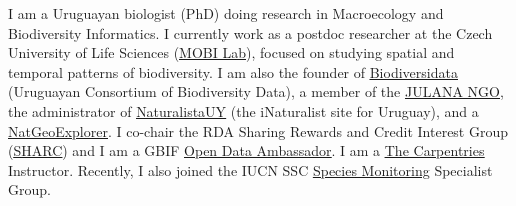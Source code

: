 \documentclass[9pt]{developercv} %
\begin{document}


I am a Uruguayan biologist (PhD) doing research in Macroecology and Biodiversity Informatics. I currently work as a postdoc researcher at the Czech University of Life Sciences (\href{https://petrkeil.github.io/}{\underline{MOBI Lab}}), focused on studying spatial and temporal patterns of biodiversity. I am also the founder of \href{https://biodiversidata.org/}{\underline{Biodiversidata}} (Uruguayan Consortium of Biodiversity Data), a member of the \href{https://julana.org/}{\underline{JULANA NGO}}, the administrator of \href{https://www.naturalista.uy/}{\underline{NaturalistaUY}} (the iNaturalist site for Uruguay), and a \href{https://www.nationalgeographic.org/find-explorers/ED0031R000029s0gjQAA}{\underline{NatGeoExplorer}}. I co-chair the RDA Sharing Rewards and Credit Interest Group  (\href{https://www.rd-alliance.org/groups/sharing-rewards-and-credit-sharc-ig}{\underline{SHARC}})  and I am a GBIF \href{https://www.gbif.org/article/1ye7qAa9Z2HVSn85bfSmLP/who-are-the-gbif-biodiversity-open-data-ambassadors}{\underline{Open Data Ambassador}}. I am a \href{https://carpentries.org}{\underline{The Carpentries}} Instructor. Recently, I also joined the IUCN SSC \href{http://www.speciesmonitoring.orgn/}{\underline{Species Monitoring}} Specialist Group. \\\

\end{document}
